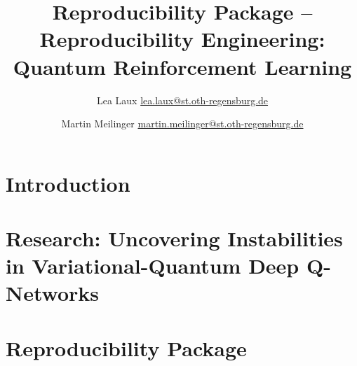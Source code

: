 \documentclass[conference]{IEEEtran}
\title{Reproducibility Package -- Reproducibility Engineering: Quantum Reinforcement Learning}
\author{Lea Laux \href{mailto:lea.laux@st.oth-regensburg.de}{lea.laux@st.oth-regensburg.de}  \and 
 Martin Meilinger \href{mailto:martin.meilinger@st.oth-regensburg.de}{martin.meilinger@st.oth-regensburg.de}}
\begin{document}
\maketitle

\section{Introduction}

\section{Research: Uncovering Instabilities in Variational-Quantum Deep Q-Networks}

\section{Reproducibility Package}

\printbibliography
\end{document}
